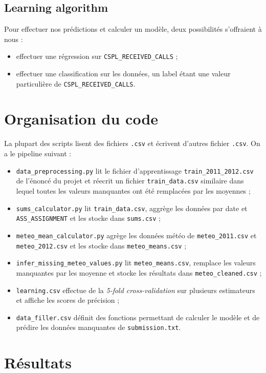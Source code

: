 \documentclass[a4paper,11pt,french]{article}
\begin{document}
    \subsection{Learning algorithm}

    Pour effectuer nos prédictions et calculer un modèle, deux possibilités s'offraient à nous :
    \begin{itemize}
        \item effectuer une régression sur \verb|CSPL_RECEIVED_CALLS| ;
        \item effectuer une classification sur les données, un label étant une valeur particulière de \verb|CSPL_RECEIVED_CALLS|.
    \end{itemize}

    \section{Organisation du code}

    La plupart des scripts lisent des fichiers \verb|.csv| et écrivent d'autres fichier \verb|.csv|. On a le pipeline suivant :
    \begin{itemize}
        \item \verb|data_preprocessing.py| lit le fichier d'apprentissage \verb|train_2011_2012.csv| de l'énoncé du projet et réecrit un fichier \verb|train_data.csv| similaire dans lequel toutes les valeurs manquantes ont été remplacées par les moyennes ;
        \item \verb|sums_calculator.py| lit \verb|train_data.csv|, aggrège les données par date et \verb|ASS_ASSIGNMENT| et les stocke dans \verb|sums.csv| ;
        \item \verb|meteo_mean_calculator.py| agrège les données météo de \verb|meteo_2011.csv| et \verb|meteo_2012.csv| et les stocke dans \verb|meteo_means.csv| ;
        \item \verb|infer_missing_meteo_values.py| lit \verb|meteo_means.csv|, remplace les valeurs manquantes par les moyenne et stocke les résultats dans \verb|meteo_cleaned.csv| ;
        \item \verb|learning.csv| effectue de la \emph{5-fold cross-validation} sur plusieurs estimateurs et affiche les scores de précision ;
        \item \verb|data_filler.csv| définit des fonctions permettant de calculer le modèle et de prédire les données manquantes de \verb|submission.txt|.
    \end{itemize}

    \section{Résultats}
\end{document}
